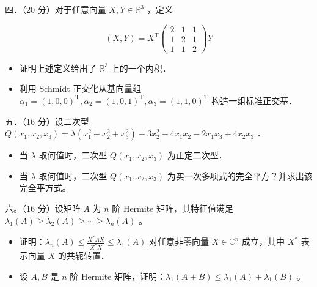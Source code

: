\documentclass{article}
\begin{document}
四．（20 分）对于任意向量 \(X, Y \in \mathbb{R}^{3}\) ，定义

\[
(X, Y)=X^{\mathrm{T}}\left(\begin{array}{lll}
2 & 1 & 1 \\
1 & 2 & 1 \\
1 & 1 & 2
\end{array}\right) Y
\]

\begin{itemize}
  \item[（1）] 证明上述定义给出了 \(\mathbb{R}^{3}\) 上的一个内积．
  \item[（2）] 利用 Schmidt 正交化从基向量组 \(\alpha_{1}=(1,0,0)^{\mathrm{T}}, \alpha_{2}=(1,0,1)^{\mathrm{T}}, \alpha_{3}=(1,1,0)^{\mathrm{T}}\) 构造一组标准正交基．
\end{itemize}

五．（16 分）设二次型 \(Q\left(x_{1}, x_{2}, x_{3}\right)=\lambda\left(x_{1}^{2}+x_{2}^{2}+x_{3}^{2}\right)+3 x_{2}^{2}-4 x_{1} x_{2}-2 x_{1} x_{3}+4 x_{2} x_{3}\) ．

\begin{itemize}
  \item[（1）] 当 \(\lambda\) 取何值时，二次型 \(Q\left(x_{1}, x_{2}, x_{3}\right)\) 为正定二次型．
  \item[（2）] 当 \(\lambda\) 取何值时，二次型 \(Q\left(x_{1}, x_{2}, x_{3}\right)\) 为实一次多项式的完全平方？并求出该完全平方式。
\end{itemize}

六。（16 分）设矩阵 \(A\) 为 \(n\) 阶 Hermite 矩阵，其特征值满足 \(\lambda_{1}(A) \geq \lambda_{2}(A) \geq \cdots \geq \lambda_{n}(A)\) 。

\begin{itemize}
  \item[（1）] 证明：\(\lambda_{n}(A) \leq \frac{X^{*} A X}{X^{*} X} \leq \lambda_{1}(A)\) 对任意非零向量 \(X \in \mathbb{C}^{n}\) 成立，其中 \(X^{*}\) 表示向量 \(X\) 的共轭转置．
  \item[（2）] 设 \(A, B\) 是 \(n\) 阶 Hermite 矩阵，证明：\(\lambda_{1}(A+B) \leq \lambda_{1}(A)+\lambda_{1}(B)\) 。
\end{itemize}
\end{document}
